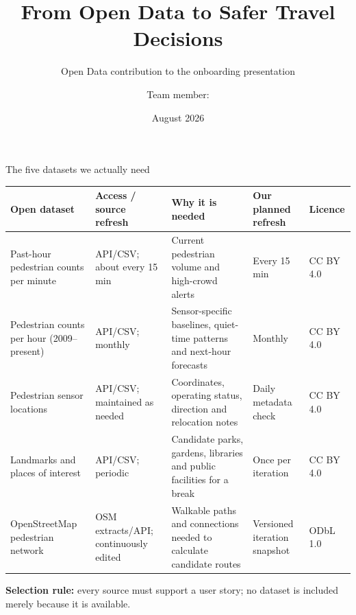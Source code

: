 \documentclass[aspectratio=169,11pt]{beamer}
\title{From Open Data to Safer Travel Decisions}
\subtitle{Open Data contribution to the onboarding presentation}
\author{Team member: \underline{\hspace{3.5cm}}}
\date{August 2026}
\begin{document}
\begin{frame}{The five datasets we actually need}
  \scriptsize
  \renewcommand{\arraystretch}{1.18}
  \begin{tabularx}{\textwidth}{p{2.5cm}p{2.0cm}X p{2.1cm}p{1.5cm}}
    \toprule
    \textbf{Open dataset} & \textbf{Access / source refresh} &
    \textbf{Why it is needed} & \textbf{Our planned refresh} &
    \textbf{Licence} \\
    \midrule
    Past-hour pedestrian counts per minute &
    API/CSV; about every 15 min &
    Current pedestrian volume and high-crowd alerts &
    Every 15 min &
    CC BY 4.0 \\

    Pedestrian counts per hour (2009--present) &
    API/CSV; monthly &
    Sensor-specific baselines, quiet-time patterns and next-hour forecasts &
    Monthly &
    CC BY 4.0 \\

    Pedestrian sensor locations &
    API/CSV; maintained as needed &
    Coordinates, operating status, direction and relocation notes &
    Daily metadata check &
    CC BY 4.0 \\

    Landmarks and places of interest &
    API/CSV; periodic &
    Candidate parks, gardens, libraries and public facilities for a break &
    Once per iteration &
    CC BY 4.0 \\

    OpenStreetMap pedestrian network &
    OSM extracts/API; continuously edited &
    Walkable paths and connections needed to calculate candidate routes &
    Versioned iteration snapshot &
    ODbL 1.0 \\
    \bottomrule
  \end{tabularx}

  \vspace{0.25em}
  \textbf{Selection rule:} every source must support a user story; no dataset is
  included merely because it is available.

\end{frame}
\end{document}
